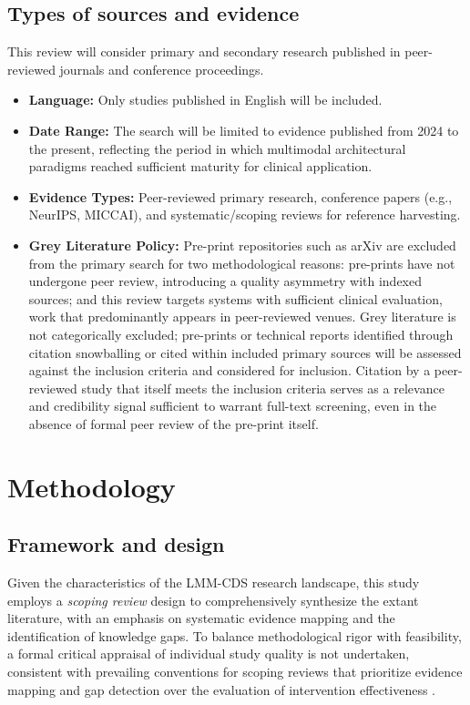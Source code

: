 \documentclass[review,12pt]{elsarticle}
\begin{document}
\subsection{Types of sources and evidence} This review will consider primary and secondary research published in peer-reviewed journals and conference proceedings.
\begin{itemize}
    \item \textbf{Language:} Only studies published in English will be included.
    \item \textbf{Date Range:} The search will be limited to evidence published from 2024 to the present, reflecting the period in which multimodal architectural paradigms reached sufficient maturity for clinical application.
    \item \textbf{Evidence Types:} Peer-reviewed primary research, conference papers (e.g., NeurIPS, MICCAI), and systematic/scoping reviews for reference harvesting. 
    \item \textbf{Grey Literature Policy:} Pre-print repositories such as arXiv are excluded from the primary search for two methodological reasons: pre-prints have not undergone peer review, introducing a quality asymmetry with indexed sources; and this review targets systems with sufficient clinical evaluation, work that predominantly appears in peer-reviewed venues. Grey literature is not categorically excluded; pre-prints or technical reports identified through citation snowballing or cited within included primary sources will be assessed against the inclusion criteria and considered for inclusion. Citation by a peer-reviewed study that itself meets the inclusion criteria serves as a relevance and credibility signal sufficient to warrant full-text screening, even in the absence of formal peer review of the pre-print itself.
\end{itemize}





\section{Methodology}
\label{method}

\subsection{Framework and design}

Given the characteristics of the LMM-CDS research landscape, this study employs a \textit{scoping review} design to comprehensively synthesize the extant literature, with an emphasis on systematic evidence mapping and the identification of knowledge gaps. To balance methodological rigor with feasibility, a formal critical appraisal of individual study quality is not undertaken, consistent with prevailing conventions for scoping reviews that prioritize evidence mapping and gap detection over the evaluation of intervention effectiveness \citep{Aromataris2024JBI}.
\end{document}
